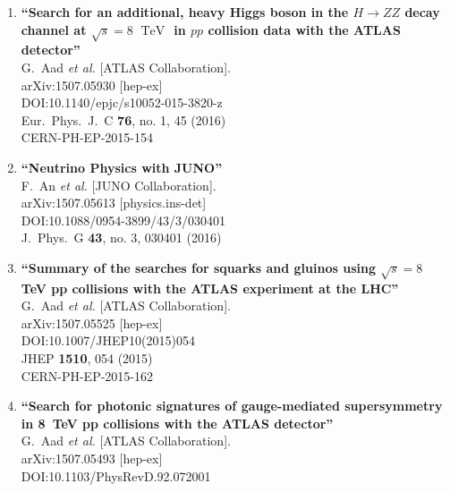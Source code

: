 \documentclass{article}
\begin{document}
\begin{enumerate}
\item%
{\bf ``Search for an additional, heavy Higgs boson in the $H\rightarrow ZZ$ decay channel at $\sqrt{s} = 8\;\text{ TeV }$ in $pp$ collision data with the ATLAS detector''}
  \\{}G.~Aad {\it et al.} [ATLAS Collaboration].
  \\{}arXiv:1507.05930 [hep-ex]
  \\{}DOI:10.1140/epjc/s10052-015-3820-z
  \\{}Eur.\ Phys.\ J.\ C {\bf 76}, no. 1, 45 (2016)
  \\{}CERN-PH-EP-2015-154
\item%
{\bf ``Neutrino Physics with JUNO''}
  \\{}F.~An {\it et al.} [JUNO Collaboration].
  \\{}arXiv:1507.05613 [physics.ins-det]
  \\{}DOI:10.1088/0954-3899/43/3/030401
  \\{}J.\ Phys.\ G {\bf 43}, no. 3, 030401 (2016)
\item%
{\bf ``Summary of the searches for squarks and gluinos using $ \sqrt{s}=8 $ TeV pp collisions with the ATLAS experiment at the LHC''}
  \\{}G.~Aad {\it et al.} [ATLAS Collaboration].
  \\{}arXiv:1507.05525 [hep-ex]
  \\{}DOI:10.1007/JHEP10(2015)054
  \\{}JHEP {\bf 1510}, 054 (2015)
  \\{}CERN-PH-EP-2015-162
\item%
{\bf ``Search for photonic signatures of gauge-mediated supersymmetry in 8 TeV pp collisions with the ATLAS detector''}
  \\{}G.~Aad {\it et al.} [ATLAS Collaboration].
  \\{}arXiv:1507.05493 [hep-ex]
  \\{}DOI:10.1103/PhysRevD.92.072001

\end{enumerate}
\end{document}
